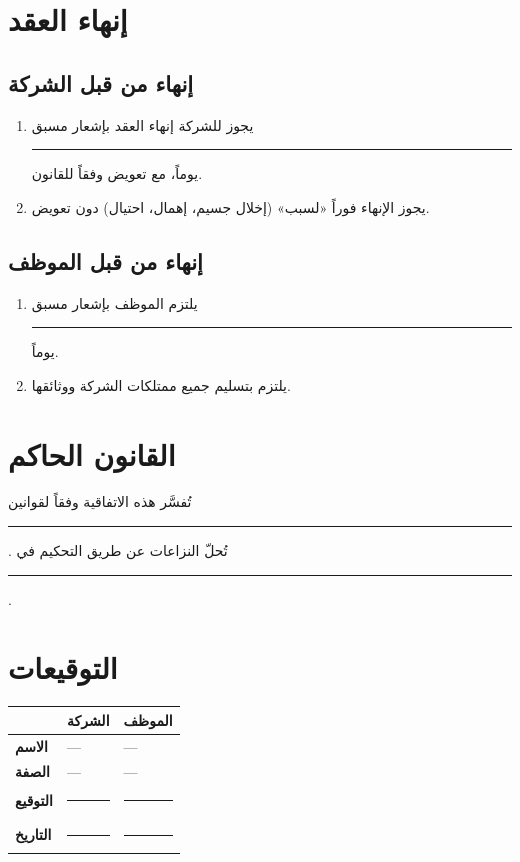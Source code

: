 \documentclass[12pt,a4paper]{article}
\begin{document}
\section{إنهاء العقد}
\label{sec:termination}
\subsection{إنهاء من قبل الشركة}
\begin{enumerate}
    \item يجوز للشركة إنهاء العقد بإشعار مسبق \rule{2cm}{0.4pt} يوماً، مع تعويض وفقاً للقانون.
    \item يجوز الإنهاء فوراً «لسبب» (إخلال جسيم، إهمال، احتيال) دون تعويض.
\end{enumerate}

\subsection{إنهاء من قبل الموظف}
\begin{enumerate}
    \item يلتزم الموظف بإشعار مسبق \rule{2cm}{0.4pt} يوماً.
    \item يلتزم بتسليم جميع ممتلكات الشركة ووثائقها.
\end{enumerate}

\section{القانون الحاكم}
\label{sec:law}
تُفسَّر هذه الاتفاقية وفقاً لقوانين \rule{6cm}{0.4pt}. تُحلّ النزاعات عن طريق التحكيم في \rule{4cm}{0.4pt}.

\vspace{2em}
\section*{التوقيعات}

\begin{table}[H]
\centering
\renewcommand{\arraystretch}{2.5}
\begin{tabularx}{\textwidth}{L{5cm} X X}
\toprule
& \textbf{الشركة} & \textbf{الموظف} \\
\midrule
\textbf{الاسم} & --- & --- \\
\textbf{الصفة} & --- & --- \\
\textbf{التوقيع} & \rule{4cm}{0.4pt} & \rule{4cm}{0.4pt} \\
\textbf{التاريخ} & \rule{4cm}{0.4pt} & \rule{4cm}{0.4pt} \\
\bottomrule
\end{tabularx}
\end{table}
\end{document}
